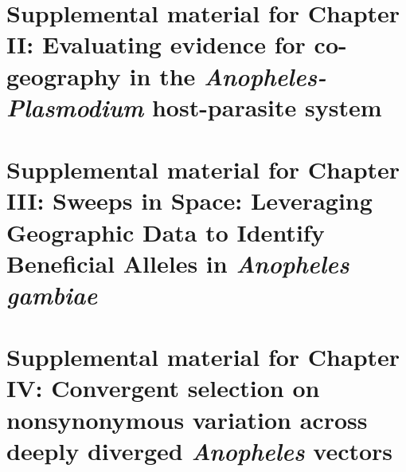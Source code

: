 \appendix
\renewcommand\thefigure{\thechapter.\arabic{figure}}
\renewcommand\thetable{\thechapter.\arabic{table}}

\chapter{Supplemental material for Chapter II: Evaluating evidence for co-geography in the \textit{Anopheles-Plasmodium} host-parasite system}


\setcounter{figure}{0}
\setcounter{table}{0}
\chapter{Supplemental material for Chapter III: Sweeps in Space: Leveraging Geographic Data to Identify Beneficial Alleles in \textit{Anopheles gambiae}}


\setcounter{figure}{0}
\setcounter{table}{0}
\chapter{Supplemental material for Chapter IV: Convergent selection on nonsynonymous variation across deeply diverged \textit{Anopheles} vectors}
